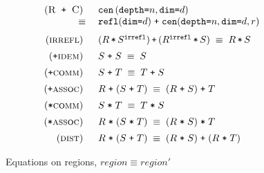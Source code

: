 \documentclass[9pt]{sigplanconf}
\theoremstyle{definition}
\newcommand{\term}[1]{\texttt{#1}}
\newcommand{\stenCenS}[2]{\term{cen} \, (\term{depth=}#1,
  \term{dim=}#2)}
\newcommand{\irreflS}{\texttt{irrefl}}
\newcommand{\stenCenSR}[3]{\term{cen} (\term{depth=}#1,
  \term{dim=}#2, #3)}
\newcommand{\stenReflSR}[1]{\term{refl} (\term{dim=}#1)}
\begin{document}
\begin{figure}
\begin{align*}
\begin{array}{c}
\begin{array}{rll}
%
%
(\textsc{R\, \texttt{+} \,C}) \;\; &
\stenCenS{n}{d} \\
\equiv \; & \stenReflSR{d} \; \texttt{+} \; \stenCenSR{n}{d}{r} \\[0.7em]
%
%
(\textsc{irrefl}) \;\; & (R \, \term{*} \, S^\irreflS) \, \term{+} \,
                         (R^\irreflS \, \term{*} \, S) \;
\equiv \; R \, \term{*} \, S \\[0.5em]
%
%
(\texttt{+}\textsc{idem}) \;\; & S \; \texttt{+} \; S \; \equiv \; S \\[0.5em]
%
(\texttt{+}\textsc{comm}) \;\; & S \; \texttt{+} \; T \; \equiv \; T \;
                       \texttt{+} \; S \\[0.5em]
%
(\texttt{+}\textsc{assoc}) \;\; & R \; \texttt{+} \; (S \; \texttt{+} \; T) \; \equiv \; (R \;
                       \texttt{+} \; S) \; \texttt{+} \; T \\[0.5em]
(\texttt{*}\textsc{comm}) \;\; & S \; \texttt{*} \; T \; \equiv \; T \;
                       \texttt{*} \; S \\[0.5em]
%
(\texttt{*}\textsc{assoc}) \;\; & R \; \texttt{*} \; (S \; \texttt{*} \; T) \; \equiv \; (R \;
                       \texttt{*} \; S) \; \texttt{*} \; T \\[0.5em]
(\textsc{dist}) \;\; & R \; \texttt{*} \; (S \; \texttt{+} \; T) \; \equiv \; (R \;
                       \texttt{*} \; S) \; \texttt{+} \; (R
                       \; \texttt{*} \; T)
\end{array}
%
\end{array}
\end{align*}
\caption{Equations on regions, $\textit{region} \equiv \textit{region}'$}
\label{fig:equations}
\end{figure}
\end{document}
